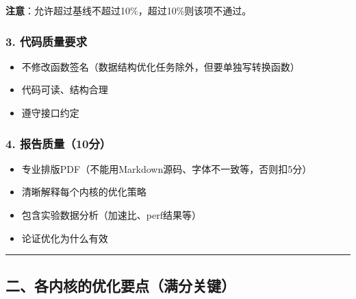 \documentclass[11pt, a4paper]{article}
\begin{document}
\begin{aibox}
\textbf{注意}：允许超过基线不超过10\%，超过10\%则该项不通过。

\subsubsection*{3. 代码质量要求}
\begin{itemize}
    \item 不修改函数签名（数据结构优化任务除外，但要单独写转换函数）
    \item 代码可读、结构合理
    \item 遵守接口约定
\end{itemize}

\subsubsection*{4. 报告质量（10分）}
\begin{itemize}
    \item 专业排版PDF（不能用Markdown源码、字体不一致等，否则扣5分）
    \item 清晰解释每个内核的优化策略
    \item 包含实验数据分析（加速比、perf结果等）
    \item 论证优化为什么有效
\end{itemize}

\begin{center}\rule{\textwidth}{0.4pt}\end{center}

\subsection*{二、各内核的优化要点（满分关键）}


\end{aibox}
\end{document}
